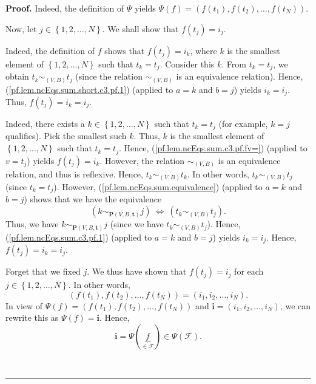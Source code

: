 \documentclass[numbers=enddot,12pt,final,onecolumn,notitlepage]{scrartcl}%
\theoremstyle{definition}
\newenvironment{proof}[1][Proof]{\noindent\textbf{#1.} }{\ \rule{0.5em}{0.5em}}
\newenvironment{verlong}{}{}
\newenvironment{vershort}{}{}
\begin{document}
\begin{proof}
Indeed, the definition of $\Psi$ yields $\Psi\left(  f\right)  =\left(
f\left(  t_{1}\right)  ,f\left(  t_{2}\right)  ,\ldots,f\left(  t_{N}\right)
\right)  $.

Now, let $j\in\left\{  1,2,\ldots,N\right\}  $. We shall show that $f\left(
t_{j}\right)  =i_{j}$.

\begin{vershort}
Indeed, the definition of $f$ shows that $f\left(  t_{j}\right)  =i_{k}$,
where $k$ is the smallest element of $\left\{  1,2,\ldots,N\right\}  $ such
that $t_{k}=t_{j}$. Consider this $k$. From $t_{k}=t_{j}$, we obtain
$t_{k}\sim_{\left(  V,B\right)  }t_{j}$ (since the relation $\sim_{\left(
V,B\right)  }$ is an equivalence relation). Hence,
(\ref{pf.lem.ncEqs.sum.short.c3.pf.1}) (applied to $a=k$ and $b=j$) yields
$i_{k}=i_{j}$. Thus, $f\left(  t_{j}\right)  =i_{k}=i_{j}$.
\end{vershort}

\begin{verlong}
Indeed, there exists a $k\in\left\{  1,2,\ldots,N\right\}  $ such that
$t_{k}=t_{j}$ (for example, $k=j$ qualifies). Pick the smallest such $k$.
Thus, $k$ is the smallest element of $\left\{  1,2,\ldots,N\right\}  $ such
that $t_{k}=t_{j}$. Hence, (\ref{pf.lem.ncEqs.sum.c3.pf.fv=}) (applied to
$v=t_{j}$) yields $f\left(  t_{j}\right)  =i_{k}$. However, the relation
$\sim_{\left(  V,B\right)  }$ is an equivalence relation, and thus is
reflexive. Hence, $t_{k}\sim_{\left(  V,B\right)  }t_{k}$. In other words,
$t_{k}\sim_{\left(  V,B\right)  }t_{j}$ (since $t_{k}=t_{j}$). However,
(\ref{pf.lem.ncEqs.sum.equivalence}) (applied to $a=k$ and $b=j$) shows that
we have the equivalence
\[
\left(  k\sim_{\mathbf{P}\left(  V,B,\mathbf{t}\right)  }j\right)
\ \Longleftrightarrow\ \left(  t_{k}\sim_{\left(  V,B\right)  }t_{j}\right)
.
\]
Thus, we have $k\sim_{\mathbf{P}\left(  V,B,\mathbf{t}\right)  }j$ (since we
have $t_{k}\sim_{\left(  V,B\right)  }t_{j}$). Hence,
(\ref{pf.lem.ncEqs.sum.c3.pf.1}) (applied to $a=k$ and $b=j$) yields
$i_{k}=i_{j}$. Hence, $f\left(  t_{j}\right)  =i_{k}=i_{j}$.
\end{verlong}

Forget that we fixed $j$. We thus have shown that $f\left(  t_{j}\right)
=i_{j}$ for each $j\in\left\{  1,2,\ldots,N\right\}  $. In other words,%
\[
\left(  f\left(  t_{1}\right)  ,f\left(  t_{2}\right)  ,\ldots,f\left(
t_{N}\right)  \right)  =\left(  i_{1},i_{2},\ldots,i_{N}\right)  .
\]
In view of $\Psi\left(  f\right)  =\left(  f\left(  t_{1}\right)  ,f\left(
t_{2}\right)  ,\ldots,f\left(  t_{N}\right)  \right)  $ and $\mathbf{i}%
=\left(  i_{1},i_{2},\ldots,i_{N}\right)  $, we can rewrite this as
$\Psi\left(  f\right)  =\mathbf{i}$. Hence,%
\[
\mathbf{i}=\Psi\left(  \underbrace{f}_{\in\mathcal{F}}\right)  \in\Psi\left(
\mathcal{F}\right)  .
\]



\end{proof}
\end{document}

